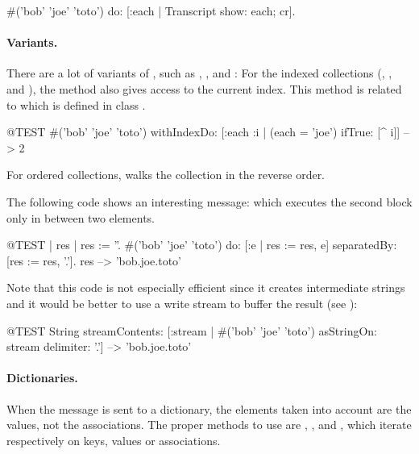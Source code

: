 \documentclass[a4paper,10pt,twoside]{book}
\begin{document}
\begin{code}{}
#('bob' 'joe' 'toto') do: [:each | Transcript show: each; cr].
\end{code}

\paragraph{Variants.}
There are a lot of variants of , such as \mbox{,} \mbox{}, and :
For the indexed collections (, , and ), the method  also gives access to the current index.
This method is related to  which is defined in class .

\begin{code}{@TEST}
#('bob' 'joe' 'toto') withIndexDo: [:each :i | (each = 'joe') ifTrue: [^ i]] --> 2
\end{code}

For ordered collections,  walks the collection in the reverse order. 

The following code shows an interesting message:  which 
executes the second block only in between two elements.
\begin{code}{@TEST | res | }
res := ''.
#('bob' 'joe' 'toto') do: [:e | res := res, e] separatedBy: [res := res, '.'].
res --> 'bob.joe.toto'
\end{code}
\noindent
Note that this code is not especially efficient since it creates intermediate strings and it would be better to use a write stream to buffer the result (see ):
\begin{code}{@TEST}
String streamContents: [:stream | #('bob' 'joe' 'toto') asStringOn: stream delimiter: '.'] --> 'bob.joe.toto'
\end{code}



\paragraph{Dictionaries.}
When the message  is sent to a dictionary, the elements taken into account are the values, not the associations. The proper methods to use are , , and , which iterate respectively on keys, values or associations.
\end{document}
